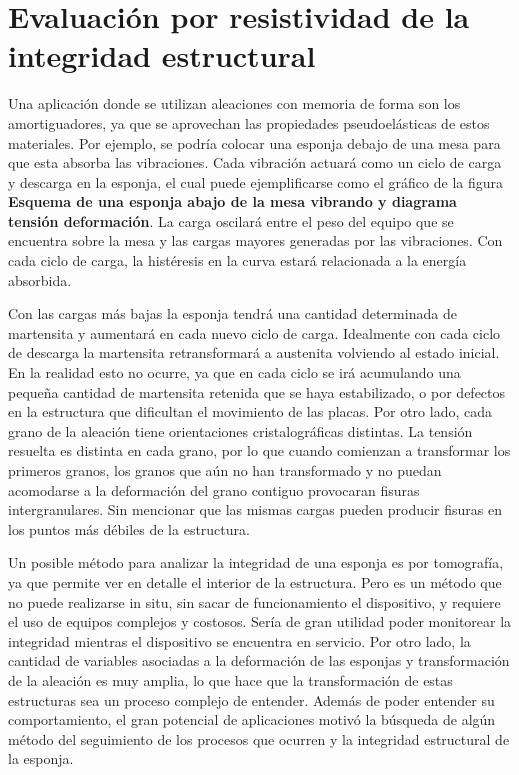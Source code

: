 \documentclass[a4paper,12pt,fleqn,twoside,openany]{book}
\begin{document}
\section{Evaluación por resistividad de la integridad estructural}



Una aplicación donde se utilizan aleaciones con memoria de forma son los amortiguadores, ya que se aprovechan las propiedades pseudoelásticas de estos materiales. Por ejemplo, se podría colocar una esponja debajo de una mesa para que esta absorba las vibraciones. Cada vibración actuará como un ciclo de carga y descarga en la esponja, el cual puede ejemplificarse como el gráfico de la figura \textbf{Esquema de una esponja abajo de la mesa vibrando y diagrama tensión deformación}. 
La carga oscilará entre el peso del equipo que se encuentra sobre la mesa y las cargas mayores generadas por las vibraciones.
Con cada ciclo de carga, la histéresis en la curva estará relacionada a la energía absorbida.  

Con las cargas más bajas la esponja tendrá una cantidad determinada de martensita y aumentará en cada nuevo ciclo de carga. Idealmente con cada ciclo de descarga la martensita retransformará a austenita volviendo al estado inicial. En la realidad esto no ocurre, ya que en cada ciclo se irá acumulando una pequeña cantidad de martensita retenida que se haya estabilizado, o por defectos en la estructura que dificultan el movimiento de las placas. Por otro lado, cada grano de la aleación tiene orientaciones cristalográficas distintas. La tensión resuelta es distinta en cada grano, por lo que cuando comienzan a transformar los primeros granos, los granos que aún no han transformado y no puedan acomodarse a la deformación del grano contiguo provocaran fisuras intergranulares. Sin mencionar que las mismas cargas pueden producir fisuras en los puntos más débiles de la estructura. 

Un posible método para analizar la integridad de una esponja es por tomografía, ya que permite ver en detalle el interior de la estructura. Pero es un método  que no puede realizarse in situ, sin sacar de funcionamiento el dispositivo, y requiere el uso de equipos complejos y costosos. Sería de gran utilidad poder monitorear la integridad mientras el dispositivo se encuentra en servicio. Por otro lado, la cantidad de variables asociadas a la deformación de las esponjas y transformación de la aleación es muy amplia, lo que hace que la transformación de estas estructuras sea un proceso complejo de entender. Además de poder entender su comportamiento, el gran potencial de aplicaciones motivó la búsqueda de algún método del seguimiento de los procesos que ocurren y la integridad estructural de la esponja.
\end{document}
